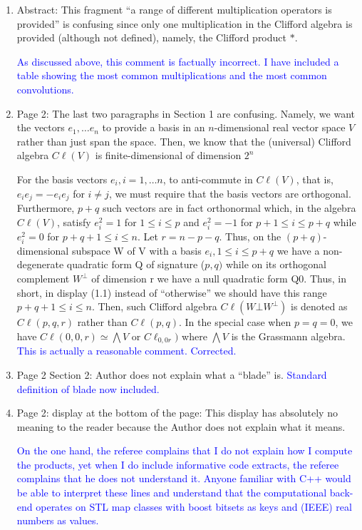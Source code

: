\documentclass{article}
\newcommand{\cliff}[1]{\ensuremath{C\ell\left(#1\right)}}
\begin{document}
\begin{enumerate}
  \item Abstract: This fragment “a range of different multiplication operators is provided” is confusing since only one multiplication in the Clifford algebra is provided (although not defined),
    namely, the Clifford product $*$.

    \textcolor{blue}{As discussed above, this comment is factually
      incorrect. I have included a table showing the most common
      multiplications and the most common convolutions.    }


\item Page 2: The last two paragraphs in Section 1 are confusing.
  Namely, we want the vectors $e_1,\ldots e_n$ to provide a basis in
  an $n$-dimensional real vector space $V$ rather than just span the
  space.  Then, we know that the (universal) Clifford algebra
  \cliff{V} is finite-dimensional of dimension $2^n$

  For the basis vectors $e_i , i = 1, \ldots n$, to anti-commute in
  \cliff{V}, that is, $e_i e_j = -e_i e_j$ for $i\neq j$, we must
  require that the basis vectors are orthogonal.  Furthermore, $p + q$
  such vectors are in fact orthonormal which, in the algebra
  \cliff{V}, satisfy $e_i^2 = 1$ for $1\leq i\leq p$ and $e_i^2 = -1$
  for $p+1\leq i\leq p+q$ while $e_i^2 = 0$ for $p + q + 1 \leq i\leq
  n$.  Let $r=n-p-q$.  Thus, on the $(p + q)$-dimensional subspace W
  of V with a basis $e_i, 1\leq i \leq p+q$ we have a non-degenerate
  quadratic form Q of signature ($p, q)$ while on its orthogonal
  complement $W^\bot$ of dimension r we have a null quadratic form
  Q0. Thus, in short, in display (1.1) instead of “otherwise” we
  should have this range $p + q + 1 \leq i \leq n$.  Then, such
  Clifford algebra \cliff{W\bot W^\bot} is denoted as \cliff{p,q,r}
  rather than \cliff{p,q}. In the special case when $p = q = 0$, we
  have $\cliff{0,0,r}\simeq\bigwedge V$ or $C\ell_{0,0r})$ where
  $\bigwedge V$ is the Grassmann algebra.
  \textcolor{blue}{This is actually a reasonable comment.  Corrected.}

\item  Page 2 Section 2: Author does not
  explain what a “blade” is.
  \textcolor{blue}{Standard definition of blade now included.}
  \item Page 2: display at the bottom of the
page: This display has absolutely no meaning to the reader because the
Author does not explain what it means.

\textcolor{blue}{On the one hand, the referee complains that I do not
  explain how I compute the products, yet when I do include
  informative code extracts, the referee complains that he does not
  understand it.  Anyone familiar with C++ would be able to interpret
  these lines and understand that the computational back-end operates
  on STL map classes with boost bitsets as keys and (IEEE) real
  numbers as values.}


\end{enumerate}
\end{document}
